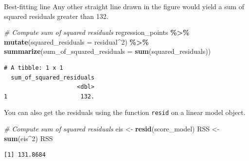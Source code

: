 \documentclass[
  ignorenonframetext,
]{beamer}
\newenvironment{Shaded}{\begin{snugshade}}{\end{snugshade}}
\newcommand{\AttributeTok}[1]{\textcolor[rgb]{0.13,0.29,0.53}{#1}}
\newcommand{\CommentTok}[1]{\textcolor[rgb]{0.56,0.35,0.01}{\textit{#1}}}
\newcommand{\DecValTok}[1]{\textcolor[rgb]{0.00,0.00,0.81}{#1}}
\newcommand{\FunctionTok}[1]{\textcolor[rgb]{0.13,0.29,0.53}{\textbf{#1}}}
\newcommand{\NormalTok}[1]{#1}
\newcommand{\OtherTok}[1]{\textcolor[rgb]{0.56,0.35,0.01}{#1}}
\newcommand{\SpecialCharTok}[1]{\textcolor[rgb]{0.81,0.36,0.00}{\textbf{#1}}}
\begin{document}
\begin{frame}[fragile]{Best-fitting line}
\protect\hypertarget{best-fitting-line-3}{}
Any other straight line drawn in the figure would yield a sum of squared
residuals greater than 132.

\tiny

\begin{Shaded}
\begin{Highlighting}[]
\CommentTok{\# Compute sum of squared residuals}
\NormalTok{regression\_points }\SpecialCharTok{\%\textgreater{}\%}
  \FunctionTok{mutate}\NormalTok{(}\AttributeTok{squared\_residuals =}\NormalTok{ residual}\SpecialCharTok{\^{}}\DecValTok{2}\NormalTok{) }\SpecialCharTok{\%\textgreater{}\%}
  \FunctionTok{summarize}\NormalTok{(}\AttributeTok{sum\_of\_squared\_residuals =} \FunctionTok{sum}\NormalTok{(squared\_residuals))}
\end{Highlighting}
\end{Shaded}

\begin{verbatim}
# A tibble: 1 x 1
  sum_of_squared_residuals
                     <dbl>
1                     132.
\end{verbatim}

\normalsize

You can also get the residuals using the function \texttt{resid} on a
linear model object.

\tiny

\begin{Shaded}
\begin{Highlighting}[]
\CommentTok{\# Compute sum of squared residuals}
\NormalTok{eis }\OtherTok{\textless{}{-}} \FunctionTok{resid}\NormalTok{(score\_model)}
\NormalTok{RSS }\OtherTok{\textless{}{-}} \FunctionTok{sum}\NormalTok{(eis}\SpecialCharTok{\^{}}\DecValTok{2}\NormalTok{)}
\NormalTok{RSS}
\end{Highlighting}
\end{Shaded}

\begin{verbatim}
[1] 131.8684
\end{verbatim}

\normalsize
\end{frame}
\end{document}
